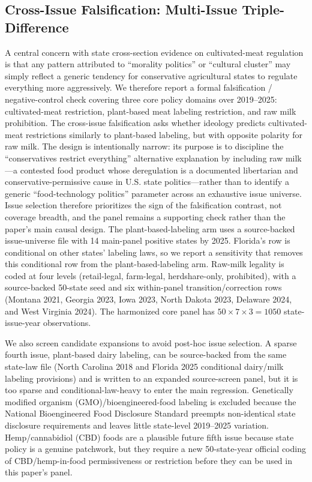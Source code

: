 \documentclass[12pt]{article}
\begin{document}
\subsection{Cross-Issue Falsification: Multi-Issue Triple-Difference}
\label{sec:multi_issue}

A central concern with state cross-section evidence on cultivated-meat regulation is that any pattern attributed to ``morality politics'' or ``cultural cluster'' may simply reflect a generic tendency for conservative agricultural states to regulate everything more aggressively.  We therefore report a formal falsification / negative-control check covering three core policy domains over 2019--2025: cultivated-meat restriction, plant-based meat labeling restriction, and raw milk prohibition.  The cross-issue falsification asks whether ideology predicts cultivated-meat restrictions similarly to plant-based labeling, but with opposite polarity for raw milk.  The design is intentionally narrow: its purpose is to discipline the ``conservatives restrict everything'' alternative explanation by including raw milk---a contested food product whose deregulation is a documented libertarian and conservative-permissive cause in U.S. state politics---rather than to identify a generic ``food-technology politics'' parameter across an exhaustive issue universe.  Issue selection therefore prioritizes the sign of the falsification contrast, not coverage breadth, and the panel remains a supporting check rather than the paper's main causal design.  The plant-based-labeling arm uses a source-backed issue-universe file with 14 main-panel positive states by 2025.  Florida's row is conditional on other states' labeling laws, so we report a sensitivity that removes this conditional row from the plant-based-labeling arm.  Raw-milk legality is coded at four levels (retail-legal, farm-legal, herdshare-only, prohibited), with a source-backed 50-state seed and six within-panel transition/correction rows (Montana 2021, Georgia 2023, Iowa 2023, North Dakota 2023, Delaware 2024, and West Virginia 2024).  The harmonized core panel has $50 \times 7 \times 3 = 1050$ state-issue-year observations.

We also screen candidate expansions to avoid post-hoc issue selection.  A sparse fourth issue, plant-based dairy labeling, can be source-backed from the same state-law file (North Carolina 2018 and Florida 2025 conditional dairy/milk labeling provisions) and is written to an expanded source-screen panel, but it is too sparse and conditional-law-heavy to enter the main regression.  Genetically modified organism (GMO)/bioengineered-food labeling is excluded because the National Bioengineered Food Disclosure Standard preempts non-identical state disclosure requirements and leaves little state-level 2019--2025 variation.  Hemp/cannabidiol (CBD) foods are a plausible future fifth issue because state policy is a genuine patchwork, but they require a new 50-state-year official coding of CBD/hemp-in-food permissiveness or restriction before they can be used in this paper's panel.
\end{document}
